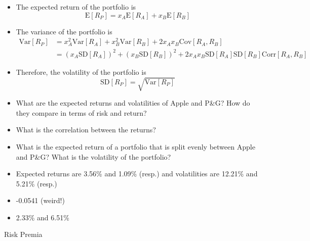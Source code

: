 \documentclass{beamer}
\begin{document}
\begin{frame}{}
	\begin{itemize}
		\item The expected return of the portfolio is
		\begin{equation*}
			\text{E}[R_{P}]=x_{A}\text{E}[R_{A}]+x_{B}\text{E}[R_{B}]
		\end{equation*}
		\item The variance of the portfolio is
		{\footnotesize
		\begin{align*}
			\text{Var}[R_{P}]&=x_{A}^{2}\text{Var}[R_{A}]+x_{B}^{2}\text{Var}[R_{B}]+2x_{A}x_{B}\text{Cov}[R_{A},R_{B}]\\
			&=(x_{A}\text{SD}[R_{A}])^{2}+(x_{B}\text{SD}[R_{B}])^{2}+2x_{A}x_{B}\text{SD}[R_{A}]\text{SD}[R_{B}]\text{Corr}[R_{A},R_{B}]
		\end{align*}
		}
		\item Therefore, the volatility of the portfolio is
		\begin{equation*}
			\text{SD}[R_{P}]=\sqrt{\text{Var}[R_{P}]}
		\end{equation*}
	\end{itemize}
\end{frame}

\begin{frame}{}
	\begin{itemize}
		\item What are the expected returns and volatilities of Apple and P\&G? How do they compare in terms of risk and return?
		\item What is the correlation between the returns?
		\item What is the expected return of a portfolio that is split evenly between Apple and P\&G? What is the volatility of the portfolio?
	\end{itemize}
	\pause
	\begin{itemize}
		\item {\color{blue}Expected returns are 3.56\% and 1.09\% (resp.) and volatilities are 12.21\% and 5.21\% (resp.)}
		\item {\color{blue}-0.0541 (weird!)}
		\item {\color{blue}2.33\% and 6.51\%}
	\end{itemize}
\end{frame}

\begin{frame}
\begin{center}
\Huge Risk Premia
\end{center}
\end{frame}
\end{document}
